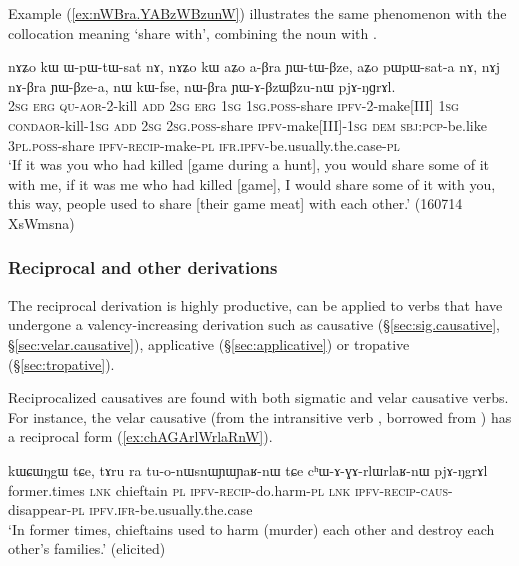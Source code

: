 Example (\ref{ex:nWBra.YABzWBzunW}) illustrates the same phenomenon with the collocation meaning `share with', combining the noun  with .

\begin{exe}
	\ex \label{ex:nWBra.YABzWBzunW}
	\gll nɤʑo kɯ ɯ-pɯ-tɯ-sat nɤ, nɤʑo kɯ aʑo a-βra ɲɯ-tɯ-βze, aʑo pɯ\redp{}pɯ-sat-a nɤ, nɤj nɤ-βra ɲɯ-βze-a, nɯ kɯ-fse, nɯ-βra ɲɯ-ɤ-βzɯ\redp{}βzu-nɯ pjɤ-ŋɡrɤl. \\
	\textsc{2sg} \textsc{erg} \textsc{qu}-\textsc{aor}-2-kill \textsc{add} 	\textsc{2sg} \textsc{erg} \textsc{1sg} \textsc{1sg}.\textsc{poss}-share \textsc{ipfv}-2-make[III] \textsc{1sg} \textsc{cond}\redp{}\textsc{aor}-kill-\textsc{1sg} \textsc{add} \textsc{2sg} \textsc{2sg}.\textsc{poss}-share \textsc{ipfv}-make[III]-\textsc{1sg} \textsc{dem} \textsc{sbj}:\textsc{pcp}-be.like \textsc{3pl}.\textsc{poss}-share \textsc{ipfv}-\textsc{recip}-make-\textsc{pl} \textsc{ifr}.\textsc{ipfv}-be.usually.the.case-\textsc{pl} \\
	\glt `If it was you who had killed [game during a hunt], you would share some of it with me, if it was me who had killed [game], I would share some of it with you, this way, people used to share [their game meat] with each other.' (160714 XsWmsna)
\end{exe}

\subsubsection{Reciprocal and other derivations} \label{sec:reciprocal.other}
The reciprocal derivation is highly productive, can be applied to verbs that have undergone a valency-increasing derivation such as causative (§\ref{sec:sig.causative}, §\ref{sec:velar.causative}), applicative (§\ref{sec:applicative}) or tropative (§\ref{sec:tropative}). 

Reciprocalized causatives are found with both sigmatic and velar causative verbs. For instance, the velar causative  (from the intransitive verb , borrowed from ) has a reciprocal form  (\ref{ex:chAGArlWrlaRnW}).

 \begin{exe}
\ex \label{ex:chAGArlWrlaRnW}
\gll kɯɕɯŋgɯ tɕe, tɤru ra tu-o-nɯsnɯɲɯ\redp{}ɲaʁ-nɯ tɕe cʰɯ-ɤ-ɣɤ-rlɯ\redp{}rlaʁ-nɯ pjɤ-ŋgrɤl \\
former.times \textsc{lnk} chieftain \textsc{pl} \textsc{ipfv}-\textsc{recip}-do.harm-\textsc{pl} \textsc{lnk} \textsc{ipfv}-\textsc{recip}-\textsc{caus}-disappear-\textsc{pl} \textsc{ipfv}.\textsc{ifr}-be.usually.the.case \\
\glt `In former times, chieftains used to harm (murder) each other and destroy each other's families.' (elicited)
\end{exe}

